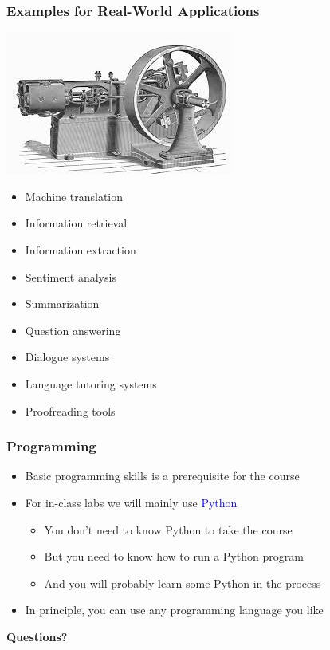 \documentclass[dvipsnames]{beamer}
\begin{document}
\begin{frame}
\frametitle{Examples for Real-World Applications}
\hfill \includegraphics[scale=0.4]{steam}
\begin{itemize}
\vspace{-2.5cm}
\item Machine translation
\item Information retrieval
\item Information extraction
\item Sentiment analysis
\item Summarization
\item Question answering
\item Dialogue systems
\item Language tutoring systems
\item Proofreading tools
\end{itemize}
\end{frame}

\begin{frame}
\frametitle{Programming}
\begin{itemize}
\item Basic programming skills is a prerequisite for the course
\item For in-class labs we will mainly use \textcolor{blue}{Python}
\begin{itemize}
\item You don't need to know Python to take the course
\item But you need to know how to run a Python program
\item And you will probably learn some Python in the process
\end{itemize}
\item In principle, you can use any programming language you like
\end{itemize}

\end{frame}

\begin{frame}
\begin{center}
{\huge {\bf Questions?}}
\end{center}
\end{frame}
\end{document}
